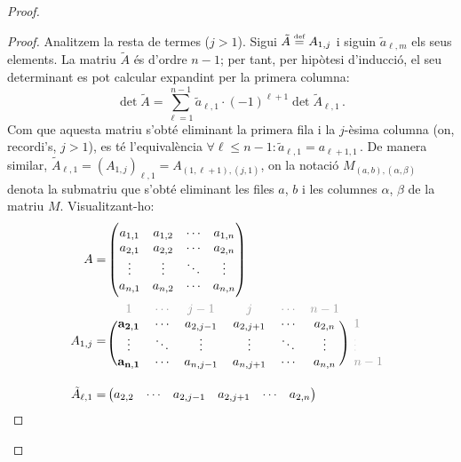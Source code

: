 \begin{teo}
\begin{proof}
\begin{lema}
\begin{adjustwidth}{0.8cm}{}
\begin{proof}
		Analitzem la resta de termes ($j>1$). Sigui $\tilde{A} \stackrel{\text{\tiny def}}{=} A_{1,j}$ i siguin $\tilde{a}_{\ell,m}$ els seus elements. La matriu $\tilde{A}$ és d'ordre $n-1$; per tant, per hipòtesi d'inducció, el seu determinant es pot calcular expandint per la primera columna: 
		\begin{equation}\label{eq:subdet}
			\det \tilde{A} = \sum_{\ell=1}^{n-1}\tilde{a}_{\ell,1}\cdot (-1)^{\ell+1}\det \tilde{A}_{\ell,1}\,. 
		\end{equation} 
		Com que aquesta matriu s'obté eliminant la primera fila i la $j$-èsima columna (on, recordi's, $j>1$), es té l'equivalència $\forall \ell \le n-1 : {\tilde{a}_{\ell,1} = a_{\ell+1,1}}\,$. De manera similar, $\tilde{A}_{\ell,1} = (A_{1,j})_{\ell,1}= A_{(1,\ell+1),(j,1)}$, on la notació $M_{(a,b),(\alpha,\beta)}$ denota la submatriu que s'obté eliminant les files $a$, $b$ i les columnes $\alpha$, $\beta$ de la matriu $M$. Visualitzant-ho:
		\begin{equation*}
			\begin{split}
			A =&
			\begin{pmatrix}
				a_{1,1}&	a_{1,2}&	\cdots&		a_{1,n}\\
				a_{2,1}&	a_{2,2}&	\cdots&		a_{2,n}\\
				\vdots&		\vdots&		\ddots&		\vdots\\
				a_{n,1}&	a_{n,2}&	\cdots&		a_{n,n}
			\end{pmatrix}\\
%
			A_{1,j} =&\
			\begin{blockarray}{rcccccc}
			\begin{block}{*{7}{>{\tiny\color[gray]{0.6}}c<{}}}
				1&	\cdots&	 j-1&	j&	\cdots&	n-1 &\\
			\end{block}
			\begin{block}{(cccccc)*{1}{>{\tiny\color[gray]{0.6}}l<{}}}
				\mathbf{a_{2,1}}&\cdots&a_{2,j-1}&a_{2,j+1}&\cdots&		a_{2,n}& 1\\
				\vdots&	   \ddots&	\vdots&	\vdots&	\ddots&		\vdots& \vdots\\
				\mathbf{a_{n,1}}&   \cdots&	a_{n,j-1}&	a_{n,j+1}&	\cdots&		a_{n,n}&	n-1\\
			\end{block}
			\end{blockarray}\\
%
			\tilde{A}_{\ell,1} =&
			\begin{pmatrix}
				a_{2,2}&\cdots&a_{2,j-1}&a_{2,j+1}&\cdots&		a_{2,n}\\

\end{pmatrix}
\end{split}
\end{equation*}
\end{proof}
\end{adjustwidth}
\end{lema}
\end{proof}
\end{teo}
